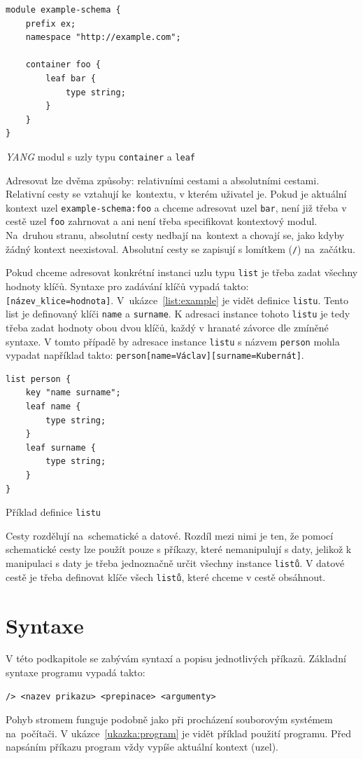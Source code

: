 \documentclass[thesis=B,czech,hidelinks]{FITthesis}[2019/03/06]
\begin{document}
\begin{listing}
\begin{verbatim}
module example-schema {
    prefix ex;
    namespace "http://example.com";

    container foo {
        leaf bar {
            type string;
        }
    }
}
\end{verbatim}
\caption{\textit{YANG} modul s uzly typu \texttt{container} a \texttt{leaf}}\label{yang:adresace}
\end{listing}

Adresovat lze dvěma způsoby: relativními cestami a absolutními cestami. Relativní cesty se vztahují ke~kontextu, v kterém uživatel je. Pokud je aktuální kontext uzel \texttt{example-schema:foo} a chceme adresovat uzel \texttt{bar}, není již třeba v cestě uzel \texttt{foo} zahrnovat a ani není třeba specifikovat kontextový modul. Na~druhou stranu, absolutní cesty nedbají na~kontext a chovají se, jako kdyby žádný kontext neexistoval. Absolutní cesty se zapisují s lomítkem (\texttt{/}) na~začátku.

Pokud chceme adresovat konkrétní instanci uzlu typu \texttt{list} je třeba zadat všechny hodnoty klíčů. Syntaxe pro zadávání klíčů vypadá takto: \verb¨[název_klice=hodnota]¨. V~ukázce~\ref{list:example} je vidět definice \texttt{listu}. Tento list je definovaný klíči \texttt{name} a \texttt{surname}. K adresaci instance tohoto \texttt{listu} je tedy třeba zadat hodnoty obou dvou klíčů, každý v hranaté závorce dle zmíněné syntaxe. V tomto případě by adresace instance \texttt{listu} s názvem \texttt{person} mohla vypadat například takto: \verb¨person[name=Václav][surname=Kubernát]¨.

\begin{listing}
\begin{verbatim}
list person {
    key "name surname";
    leaf name {
        type string;
    }
    leaf surname {
        type string;
    }
}
\end{verbatim}
\caption{Příklad definice \texttt{listu}}\label{list:example}
\end{listing}

Cesty rozdělují na~schematické a datové. Rozdíl mezi nimi je ten, že pomocí schematické cesty lze použít pouze s příkazy, které nemanipulují s daty, jelikož k manipulaci s daty je třeba jednoznačně určit všechny instance \texttt{listů}. V datové cestě je třeba definovat klíče všech \texttt{listů}, které chceme v cestě obsáhnout.

\section{Syntaxe}\label{syntaxe}
V této podkapitole se zabývám syntaxí a popisu jednotlivých příkazů. Základní syntaxe programu vypadá takto:
\begin{verbatim}
/> <nazev prikazu> <prepinace> <argumenty>
\end{verbatim}
Pohyb stromem funguje podobně jako při procházení souborovým systémem na~počítači. V ukázce~\ref{ukazka:program} je vidět příklad použití programu. Před napsáním příkazu program vždy vypíše aktuální kontext (uzel).
\end{document}
